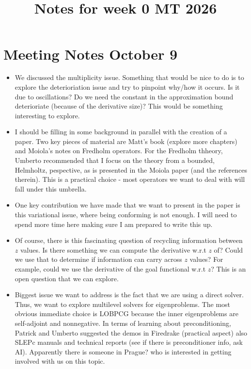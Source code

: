 \documentclass[12pt,a4paper]{article}
\title{\textbf{Notes for week 0 MT 2026}}
\author{}
\date{}
\begin{document}
\maketitle

\section{Meeting Notes October 9}

\begin{itemize}
    \item We discussed the multiplicity issue. Something that would be nice to do is to explore the deterioriation issue and try to pinpoint why/how it occurs. Is it due to oscillations? Do we need the constant in the approximation bound deterioriate (because of the derivative size)? This would be something interesting to explore.
    \item I should be filling in some background in parallel with the creation of a paper. Two key pieces of material are Matt's book (explore more chapters) and Moiola's notes on Fredholm operators. For the Fredholm thheory, Umberto recommended that I focus on the theory from a bounded, Helmholtz, pespective, as is presented in the Moiola paper (and the references therein). This is a practical choice - most operators we want to deal with will fall under this umbrella.
    \item One key contribution we have made that we want to present in the paper is this variational issue, where being conforming is not enough. I will need to spend more time here making sure I am prepared to write this up. 
    \item Of course, there is this fascinating question of recycling information between $z$ values. Is there something we can compute the derivative w.r.t $z$ of? Could we use that to determine if information can carry across $z$ values? For example, could we use the derivative of the goal functional w.r.t $z$? This is an open question that we can explore. 
    \item Biggest issue we want to address is the fact that we are using a direct solver. Thus, we want to explore multilevel solvers for eigenproblems. The most obvious immediate choice is LOBPCG because the inner eigenproblems are self-adjoint and nonnegative. In terms of learning about preconditioning, Patrick and Umberto suggested the demos in Firedrake (practical aspect) also SLEPc manuals and technical reports (see if there is preconditioner info, ask AI). Apparently there is someone in Prague? who is interested in getting involved with us on this topic.

\end{itemize}
\end{document}
